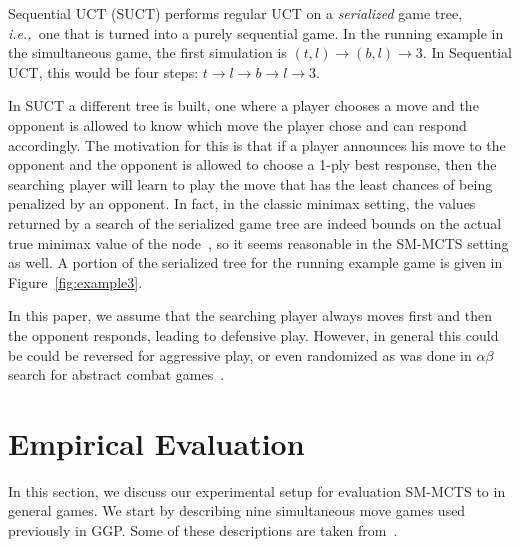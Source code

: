 \documentclass[conference]{IEEEtran}
\newcommand{\ie}{{\it i.e.,}~}
\begin{document}
Sequential UCT (SUCT) performs regular UCT on a {\it serialized} game tree, \ie one that is turned into a 
purely sequential game. 
In the running example in the simultaneous game, the first simulation is $(t,l) \rightarrow (b,l) \rightarrow 3$. 
In Sequential UCT, this would be four steps: $t \rightarrow l \rightarrow b \rightarrow l \rightarrow 3$. 

In SUCT a different tree is built, one where a player chooses a move and the opponent is 
allowed to know which move the player chose and can respond accordingly. 
The motivation for this is that if a player
announces his move to the opponent and the opponent is allowed to choose a 1-ply best response, then the searching player
will learn to play the move that has the least chances of being penalized by an opponent. In fact, in the classic 
minimax setting, the values returned by a search of the serialized game tree are indeed bounds on the actual true 
minimax value of the node~\cite[Corollary 4.2]{Bosansky13Using}, so it seems reasonable in the SM-MCTS setting as well. 
A portion of the serialized tree for the running example game is given in Figure~\ref{fig:example3}. 

In this paper, we assume that the searching player always moves first and then the opponent responds, leading to 
defensive play. However, in general this could be could be reversed for aggressive play, or even randomized as was 
done in $\alpha\beta$ search for abstract combat games~\cite{Kovarsky05RAB}.



\section{Empirical Evaluation}
\label{sec:exp}

In this section, we discuss our experimental setup for evaluation SM-MCTS to in general games.
We start by describing nine simultaneous move games used previously in GGP. Some of these 
descriptions are taken from~\cite[Appendix C]{Finnsson12}.

\end{document}
